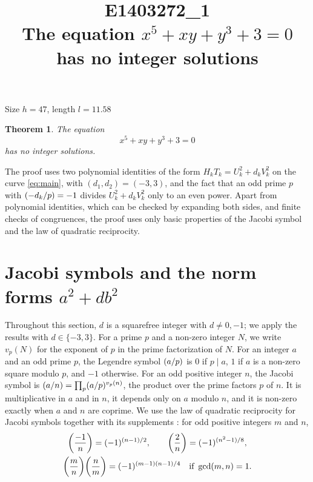 \documentclass[11pt]{article}
\title{\textbf{E1403272\_1}\\[4pt] {\Large The equation $x^{5}+xy+y^{3}+3=0$ has no integer solutions}}
\author{}
\date{}
\newtheorem{theorem}{Theorem}
\newcommand{\leg}[2]{\mathchoice{\biggl(\dfrac{#1}{#2}\biggr)}{(#1/#2)}{(#1/#2)}{(#1/#2)}}
\begin{document}
\maketitle
\vspace{-8ex}
\begin{center}
Size $h=47$, length $l=11.58$
\end{center}

\begin{theorem}\label{thm:main}
The equation
\begin{equation}\label{eq:main}
x^{5}+xy+y^{3}+3=0
\end{equation}
has no integer solutions.
\end{theorem}

The proof uses two polynomial identities of the form $H_kT_k=U_k^2+d_kV_k^2$ on the curve \eqref{eq:main}, with $(d_1,d_2)=(-3,3)$, and the fact that an odd prime $p$ with $\leg{-d_k}{p}=-1$ divides $U_k^2+d_kV_k^2$ only to an even power. Apart from polynomial identities, which can be checked by expanding both sides, and finite checks of congruences, the proof uses only basic properties of the Jacobi symbol and the law of quadratic reciprocity.

\section{Jacobi symbols and the norm forms $a^2+db^2$}

Throughout this section, $d$ is a squarefree integer with $d\neq0,-1$; we apply the results with $d\in\{-3,3\}$. For a prime $p$ and a non-zero integer $N$, we write $v_p(N)$ for the exponent of $p$ in the prime factorization of $N$. For an integer $a$ and an odd prime $p$, the Legendre symbol $\leg{a}{p}$ is $0$ if $p\mid a$, $1$ if $a$ is a non-zero square modulo $p$, and $-1$ otherwise. For an odd positive integer $n$, the Jacobi symbol is $\leg{a}{n}=\prod_p\leg{a}{p}^{v_p(n)}$, the product over the prime factors $p$ of $n$. It is multiplicative in $a$ and in $n$, it depends only on $a$ modulo $n$, and it is non-zero exactly when $a$ and $n$ are coprime. We use the law of quadratic reciprocity for Jacobi symbols together with its supplements \cite[Chapter~5, \S2]{IR}: for odd positive integers $m$ and $n$,
\begin{gather*}
\leg{-1}{n}=(-1)^{(n-1)/2},\qquad\leg{2}{n}=(-1)^{(n^2-1)/8},\\
\leg{m}{n}\leg{n}{m}=(-1)^{(m-1)(n-1)/4}\quad\text{if }\gcd(m,n)=1.
\end{gather*}
\end{document}
